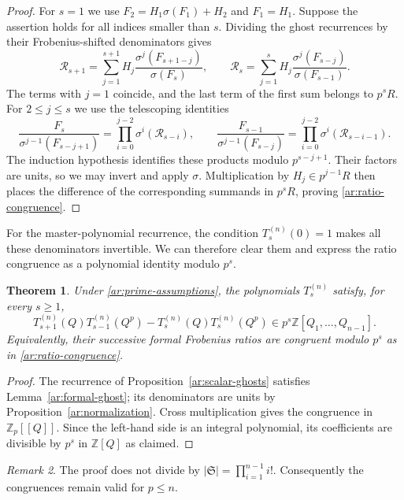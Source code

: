 \documentclass[11pt]{amsart}
\newtheorem{theorem}{Theorem}[section]
\theoremstyle{definition}
\theoremstyle{remark}
\newtheorem{remark}[theorem]{Remark}
\numberwithin{equation}{section}
\newcommand{\Z}{\mathbb Z}
\begin{document}
\begin{proof}
For $s=1$ we use $F_2=H_1\sigma(F_1)+H_2$ and $F_1=H_1$.
Suppose the assertion holds for all indices smaller than $s$.
Dividing the ghost recurrences by their Frobenius-shifted
denominators gives
\[
 \mathcal R_{s+1}=
 \sum_{j=1}^{s+1}H_j
   \frac{\sigma^j(F_{s+1-j})}{\sigma(F_s)},\qquad
 \mathcal R_s=
 \sum_{j=1}^{s}H_j
   \frac{\sigma^j(F_{s-j})}{\sigma(F_{s-1})}.
\]
The terms with $j=1$ coincide, and the last term of the first sum
belongs to $p^sR$. For $2\leq j\leq s$ we use the telescoping
identities
\[
 \frac{F_s}{\sigma^{j-1}(F_{s-j+1})}
 =\prod_{i=0}^{j-2}\sigma^i(\mathcal R_{s-i}),\qquad
 \frac{F_{s-1}}{\sigma^{j-1}(F_{s-j})}
 =\prod_{i=0}^{j-2}\sigma^i(\mathcal R_{s-i-1}).
\]
The induction hypothesis identifies these products modulo
$p^{s-j+1}$. Their factors are units, so we may invert and apply
$\sigma$. Multiplication by $H_j\in p^{j-1}R$ then places the
difference of the corresponding summands in $p^sR$, proving
\eqref{ar:ratio-congruence}.
\end{proof}

For the master-polynomial recurrence, the condition
$T_s^{(n)}(0)=1$ makes all these denominators invertible. We can
therefore clear them and express the ratio congruence as a
polynomial identity modulo $p^s$.

\begin{theorem}\label{ar:dwork}
Under \eqref{ar:prime-assumptions}, the polynomials
$T_s^{(n)}$ satisfy, for every $s\geq1$,
\begin{equation}\label{ar:dwork-cross}
 T_{s+1}^{(n)}(Q)T_{s-1}^{(n)}(Q^p)
 -T_s^{(n)}(Q)T_s^{(n)}(Q^p)
 \in p^s\Z[Q_1,\ldots,Q_{n-1}].
\end{equation}
Equivalently, their successive formal Frobenius ratios are congruent
modulo $p^s$ as in \eqref{ar:ratio-congruence}.
\end{theorem}

\begin{proof}
The recurrence of Proposition~\ref{ar:scalar-ghosts} satisfies
Lemma~\ref{ar:formal-ghost}; its denominators are units by
Proposition~\ref{ar:normalization}. Cross multiplication gives
the congruence in $\Z_p[[Q]]$. Since the left-hand side is an
integral polynomial, its coefficients are divisible by $p^s$
in $\Z[Q]$ as claimed.
\end{proof}

\begin{remark}\label{ar:small-primes}
The proof does not divide by $|\mathfrak S|=\prod_{i=1}^{n-1}i!$.
Consequently the congruences remain valid for $p\leq n$.
\end{remark}
\end{document}
